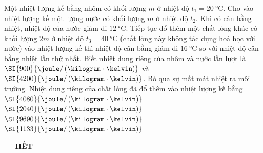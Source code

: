 \begin{ex}
Một nhiệt lượng kế bằng nhôm có khối lượng $m$ ở nhiệt độ $t_1=\SI{20}{\celsius}$. Cho vào nhiệt lượng kế một lượng nước có khối lượng $m$ ở nhiệt độ $t_2$. Khi có cân bằng nhiệt, nhiệt độ của nước giảm đi $\SI{12}{\celsius}$. Tiếp tục đổ thêm một chất lỏng khác có khối lượng $2m$ ở nhiệt độ $t_3=\SI{40}{\celsius}$ (chất lỏng này không tác dụng hoá học với nước) vào nhiệt lượng kế thì nhiệt độ cân bằng giảm đi $\SI{16}{\celsius}$ so với nhiệt độ cân bằng nhiệt lần thứ nhất. Biết nhiệt dung riêng của nhôm và nước lần lượt là $\SI{900}{\joule/\left(\kilogram\cdot\kelvin\right)}$ và $\SI{4200}{\joule/\left(\kilogram\cdot\kelvin\right)}$. Bỏ qua sự mất mát nhiệt ra môi trường. Nhiệt dung riêng của chất lỏng đã đổ thêm vào nhiệt lượng kế bằng	
	\choice
	{$\SI{4080}{\joule/\left(\kilogram\cdot\kelvin\right)}$}
	{\True $\SI{2040}{\joule/\left(\kilogram\cdot\kelvin\right)}$}
	{$\SI{9690}{\joule/\left(\kilogram\cdot\kelvin\right)}$}
	{$\SI{1133}{\joule/\left(\kilogram\cdot\kelvin\right)}$}
\end{ex}
\begin{center}
	\textbf{--- HẾT ---}
\end{center}
